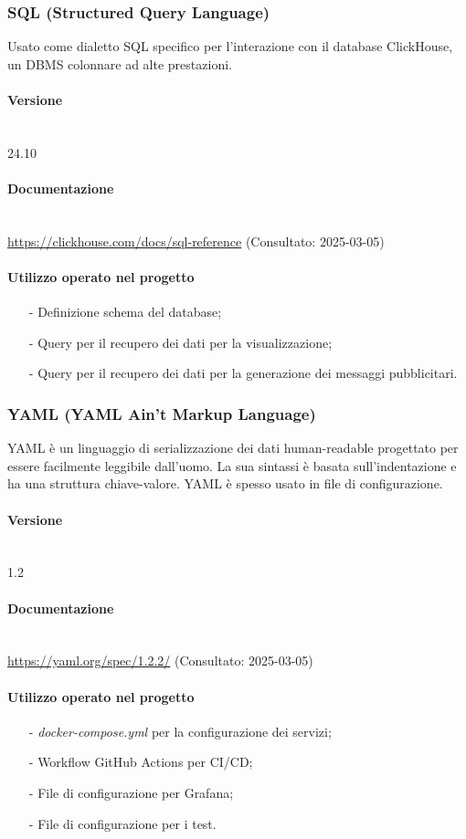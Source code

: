 \documentclass[10pt]{article}
\newcommand{\myparagraph}[1]{\paragraph{#1}\mbox{}\\\vspace{0.4em}}
\begin{document}
\begin{justify}
    \subsubsection{SQL (Structured Query Language)}
    Usato come dialetto SQL specifico per l'interazione con il database ClickHouse, un DBMS colonnare ad alte prestazioni.
        \myparagraph{Versione}
            24.10
        \myparagraph{Documentazione}
            \textcolor{blue}{\url{https://clickhouse.com/docs/sql-reference}} (Consultato: 2025-03-05)
        \paragraph{Utilizzo operato nel progetto}
            \begin{itemize}
                \item[-] Definizione schema del database;
                \item[-] Query per il recupero dei dati per la visualizzazione;
                \item[-] Query per il recupero dei dati per la generazione dei messaggi pubblicitari.
            \end{itemize}

    \subsubsection{YAML (YAML Ain't Markup Language)}
    YAML è un linguaggio di serializzazione dei dati human-readable progettato per essere facilmente leggibile dall'uomo. La sua 
    sintassi è basata sull'indentazione e ha una struttura chiave-valore. YAML è spesso usato in file di configurazione.
        \myparagraph{Versione} 
            1.2
        \myparagraph{Documentazione}
           \textcolor{blue}{\url{https://yaml.org/spec/1.2.2/}} (Consultato: 2025-03-05)
        \paragraph{Utilizzo operato nel progetto}
            \begin{itemize}
                \item[-] \textit{docker-compose.yml} per la configurazione dei servizi;
                \item[-] Workflow GitHub Actions per CI/CD;
                \item[-] File di configurazione per Grafana;
                \item[-] File di configurazione per i test.
            \end{itemize}

\end{justify}
\end{document}

